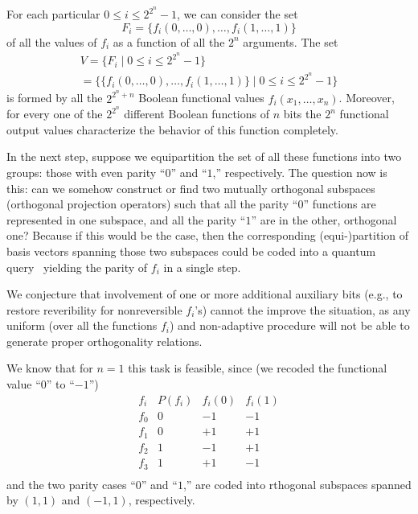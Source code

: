 \documentclass[%
 12pt,
 reprint,
  twocolumn,
 showpacs,
 showkeys,
 preprintnumbers,
 amsmath,amssymb,
 aps,
  pra,
  longbibliography,
 ]{revtex4-1}
\begin{document}
For each particular $0\le i \le 2^{2^n}-1$, we can consider the set
\begin{equation}
F_i = \{ f_i (0,\ldots , 0),  \ldots , f_i (1,\ldots , 1) \}
\end{equation}
of all the values of $f_i$ as a function of all the $2^n$ arguments.
The set
\begin{equation}
\begin{split}
V = \{F_i \mid 0\le i \le 2^{2^n}-1 \} \\
= \big\{ \{ f_i (0,\ldots , 0),  \ldots , f_i (1,\ldots , 1) \}\mid 0\le i \le 2^{2^n}-1 \big\}
\end{split}
\end{equation}
is formed by
all the $2^{2^n+n}$ Boolean functional values $f_i(  x_1,\ldots , x_n )$.
Moreover, for every one of the $2^{2^n}$ different Boolean functions of $n$ bits the $2^n$ functional output values
characterize the behavior of this function completely.



In the next step, suppose we equipartition the set of all these functions into two groups:
those with even parity ``$0$'' and ``$1$,'' respectively.
The question now is this: can we somehow construct or find two mutually orthogonal subspaces (orthogonal projection operators)
such that all the parity ``$0$'' functions are represented in one subspace, and all the parity ``$1$'' are in the other, orthogonal one?
Because if this would be the case, then the corresponding (equi-)partition of basis vectors spanning those two subspaces
could be coded into a quantum query~\cite{DonSvo01} yielding the parity of $f_i$ in a single step.

We conjecture that involvement of one or more additional auxiliary bits
(e.g., to restore reveribility for nonreversible $f_i$'s)  cannot the improve the situation,
as any uniform (over all the functions $f_i$) and
non-adaptive procedure
will not be able to generate proper orthogonality relations.


We know that for $n=1$ this task is feasible, since (we recoded the functional value ``$0$'' to ``$-1$'')
\begin{equation}
\begin{array}{c|ccc}
f_i&P(f_i)&f_i(0)&f_i(1) \\
\hline
f_0& 0 & -1 & -1 \\
f_1& 0 & +1 & +1 \\
f_2& 1 & -1 & +1 \\
f_3& 1 & +1 & -1 \\
\end{array}
\end{equation}
and the two parity cases ``$0$'' and ``$1$,'' are coded into rthogonal subspaces spanned by $(1,1)$ and $(-1,1)$, respectively.
\end{document}
